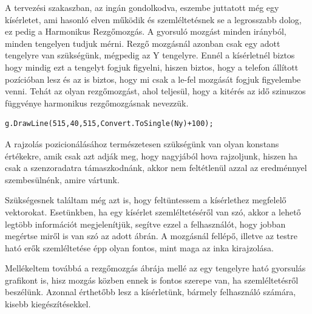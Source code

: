 \documentclass{thesis-ekf}
\theoremstyle{definition}
\theoremstyle{remark}
\begin{document}
\par A tervezési szakaszban, az ingán gondolkodva, eszembe juttatott még egy kísérletet, ami hasonló elven működik és szemléltetésnek se a legrosszabb dolog, ez pedig a Harmonikus Rezgőmozgás. A gyorsuló mozgást minden irányból, minden tengelyen tudjuk mérni. Rezgő mozgásnál azonban csak egy adott tengelyre van szükségünk, mégpedig az Y tengelyre. Ennél a kísérletnél biztos hogy mindig ezt a tengelyt fogjuk figyelni, hiszen biztos, hogy a telefon állított pozícióban lesz és az is biztos, hogy mi csak a le-fel mozgását fogjuk figyelembe venni.  Tehát az olyan rezgőmozgást, ahol teljesül, hogy a kitérés az idő szinuszos függvénye harmonikus rezgőmozgásnak nevezzük.
 \begin{lstlisting}
g.DrawLine(515,40,515,Convert.ToSingle(Ny)+100);
 \end{lstlisting}
\par A rajzolás pozicionálásához természetesen szükségünk van olyan konstans értékekre, amik csak azt adják meg, hogy nagyjából hova rajzoljunk, hiszen ha csak a szenzoradatra támaszkodnánk, akkor nem feltétlenül azzal az eredménnyel szembesülnénk, amire vártunk.
\par Szükségesnek találtam még azt is, hogy feltüntessem a kísérlethez megfelelő vektorokat. Esetünkben, ha egy kísérlet szemléltetéséről van szó, akkor a lehető legtöbb információt megjelenítjük, segítve ezzel a felhasználót, hogy jobban megértse miről is van szó az adott ábrán. A mozgásnál fellépő, illetve az testre ható erők szemléltetése épp olyan fontos, mint maga az inka kirajzolása.
\par Mellékeltem továbbá a rezgőmozgás ábrája mellé az egy tengelyre ható gyorsulás grafikont is, hisz mozgás közben ennek is fontos szerepe van, ha szemléltetésről beszélünk. Azonnal érthetőbb lesz a kísérletünk, bármely felhasználó számára, kisebb kiegészítésekkel.
\end{document}
